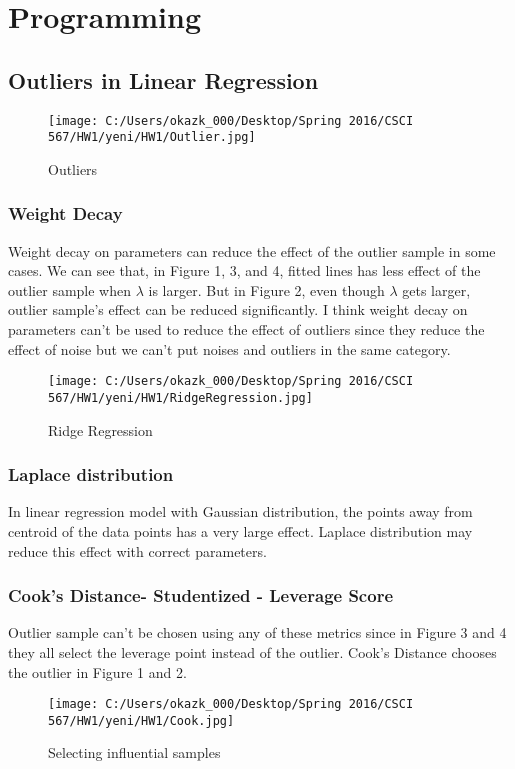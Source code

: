 \documentclass[letter,11pt]{article}
\begin{document}
	\section{Programming}
	\subsection{Outliers in Linear Regression}
	\begin{figure}[H]%
		\centering
		\texttt{[image: C:/Users/okazk\_000/Desktop/Spring 2016/CSCI 567/HW1/yeni/HW1/Outlier.jpg]}
		\caption{Outliers}
		\label{fig:test}
	\end{figure}

\subsubsection{Weight Decay}
Weight decay on parameters can reduce the effect of the outlier sample in some cases. We can see that, in Figure 1, 3, and 4, fitted lines has less effect of the outlier sample when $\lambda$ is larger. But in Figure 2, even though $\lambda$ gets larger, outlier sample's effect can be reduced significantly. I think weight decay on parameters can't be used to reduce the effect of outliers since they reduce the effect of noise but we can't put noises and outliers in the same category.

\begin{figure}[H]%
	\centering
	\texttt{[image: C:/Users/okazk\_000/Desktop/Spring 2016/CSCI 567/HW1/yeni/HW1/RidgeRegression.jpg]}
	\caption{Ridge Regression}
	\label{fig:test}
\end{figure}

\subsubsection{Laplace distribution}
In linear regression model with Gaussian distribution, the points away from centroid of the data points has a very large effect. Laplace distribution may reduce this effect with correct parameters.


\subsubsection{Cook's Distance- Studentized - Leverage Score}
Outlier sample can't be chosen using any of these metrics since in Figure 3 and 4 they all select the leverage point instead of the outlier. Cook's Distance chooses the outlier in Figure 1 and 2.
\begin{figure}[H]%
	\centering
	\texttt{[image: C:/Users/okazk\_000/Desktop/Spring 2016/CSCI 567/HW1/yeni/HW1/Cook.jpg]}
	\caption{Selecting influential samples}
	\label{fig:test}
\end{figure}
\end{document}
